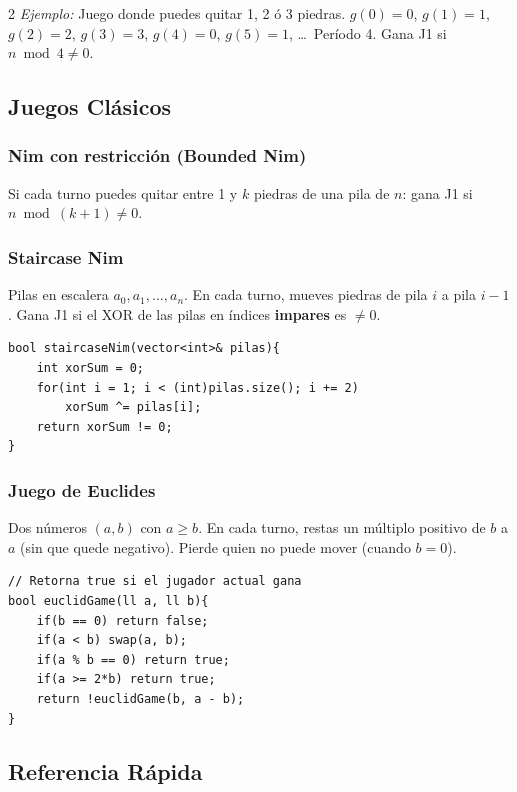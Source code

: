 \documentclass[10pt,a4paper]{article}
\begin{document}
\begin{multicols}{2}
\textit{Ejemplo:} Juego donde puedes quitar 1, 2 \'o 3 piedras. $g(0)=0$, $g(1)=1$, $g(2)=2$, $g(3)=3$, $g(4)=0$, $g(5)=1$, \ldots\ Per\'iodo 4. Gana J1 si $n \bmod 4 \neq 0$.

\subsection{Juegos Cl\'asicos}

\subsubsection{Nim con restricci\'on (Bounded Nim)}
Si cada turno puedes quitar entre 1 y $k$ piedras de una pila de $n$: gana J1 si $n \bmod (k+1) \neq 0$.

\subsubsection{Staircase Nim}
Pilas en escalera $a_0, a_1, \ldots, a_n$. En cada turno, mueves piedras de pila $i$ a pila $i-1$. Gana J1 si el XOR de las pilas en \'indices \textbf{impares} es $\neq 0$.

\begin{lstlisting}
bool staircaseNim(vector<int>& pilas){
    int xorSum = 0;
    for(int i = 1; i < (int)pilas.size(); i += 2)
        xorSum ^= pilas[i];
    return xorSum != 0;
}
\end{lstlisting}

\subsubsection{Juego de Euclides}
Dos n\'umeros $(a, b)$ con $a \geq b$. En cada turno, restas un m\'ultiplo positivo de $b$ a $a$ (sin que quede negativo). Pierde quien no puede mover (cuando $b = 0$).

\begin{lstlisting}
// Retorna true si el jugador actual gana
bool euclidGame(ll a, ll b){
    if(b == 0) return false;
    if(a < b) swap(a, b);
    if(a % b == 0) return true;
    if(a >= 2*b) return true;
    return !euclidGame(b, a - b);
}
\end{lstlisting}

\subsection{Referencia R\'apida}


\end{multicols}
\end{document}
